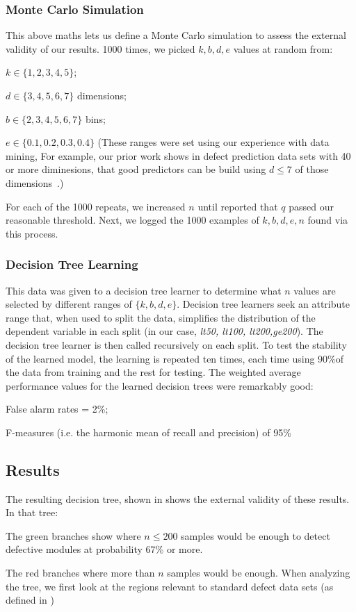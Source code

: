 \subsubsection{Monte Carlo Simulation}
    This above maths lets us define
    a  Monte Carlo simulation to assess the external validity of our results.
    1000 times, we picked $k,b,d,e$ values at random from:
    \bi
      \item $k \in \{1,2,3,4,5\}$;
  \item $d \in \{3,4,5,6,7\}$ dimensions;
  \item $b \in \{2,3,4,5,6,7\}$ bins; 
    \item $e\in \{0.1,0.2,0.3,0.4\}$
      \ei
      (These ranges were set using our experience with data mining, For example, our prior work shows in defect prediction data sets
      with 40 or more diminesions, that good predictors can be build using $d\le 7$ of those dimensions~\cite{me07a}.)
      
    For each of the 1000 repeats,
     we increased $n$ until  reported that $q$ passed our reasonable threshold.
     Next, we logged the 1000 examples of   $k,b,d,e,n$ found via this process.

\subsubsection{Decision Tree Learning}

    This data was given to a decision tree learner to determine what $n$ values are selected by different
    ranges of $\{k,b,d,e\}$. Decision tree learners seek an attribute range that, when used to split the data,
      simplifies the distribution of the dependent variable in each split (in our case, {\em lt50, lt100, lt200,ge200}).
      The decision tree learner is then called recursively on each split.
      To test the stability of the learned model, the learning is repeated ten times, each time using 90\%of the data from training and the rest
      for testing. The weighted average performance values for the learned decision trees were remarkably good:
      \bi
    \item False alarm rates = 2\%;
    \item F-measures (i.e. the harmonic mean of recall and precision) of 95\%
      \ei
\subsection{Results}

The resulting decision tree, shown in 
shows the external validity of these results. In that tree:
\bi
\item
The green branches show where $n \le 200$ samples would
be enough to detect defective modules at probability
67\% or more.
\item
The red branches where more than $n$ samples would be enough.
\ei
When analyzing the tree, we first look at the regions relevant to standard defect data sets (as defined in )


